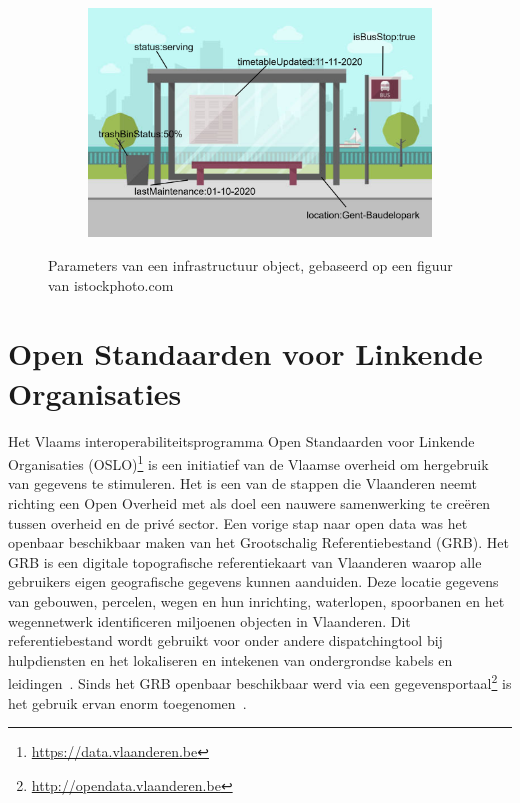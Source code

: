 \begin{figure}[h]
	\centering
	\begin{subfigure}{\textwidth}
		\centering
		\centerline{
			\includegraphics[scale=0.35]{images/busstation_labels.png}
		}
	\end{subfigure}
	\caption{Parameters van een infrastructuur object, gebaseerd op een figuur van istockphoto.com}
	\label{fig:busstation_labels}
\end{figure}

\section{Open Standaarden voor Linkende Organisaties}
\label{sec:OSLO}
Het Vlaams interoperabiliteitsprogramma Open Standaarden voor Linkende Organisaties (OSLO)\footnote{\url{https://data.vlaanderen.be}} is een initiatief van de Vlaamse overheid om hergebruik van gegevens te stimuleren. Het is een van de stappen die Vlaanderen neemt richting een Open Overheid met als doel een nauwere samenwerking te creëren tussen overheid en de privé sector.
Een vorige stap naar open data was het openbaar beschikbaar maken van het Grootschalig Referentiebestand (GRB). Het GRB is een digitale topografische referentiekaart van Vlaanderen waarop alle gebruikers eigen geografische gegevens kunnen aanduiden. Deze locatie gegevens van gebouwen, percelen, wegen en hun inrichting, waterlopen, spoorbanen en het wegennetwerk identificeren miljoenen objecten in Vlaanderen. Dit referentiebestand wordt gebruikt voor onder andere dispatchingtool bij hulpdiensten en het lokaliseren en intekenen van ondergrondse kabels en leidingen~\cite{wat_is_grb}. Sinds het GRB openbaar beschikbaar werd via een gegevensportaal\footnote{\url{http://opendata.vlaanderen.be}} is het gebruik ervan enorm toegenomen~\cite{grb_OD}.

